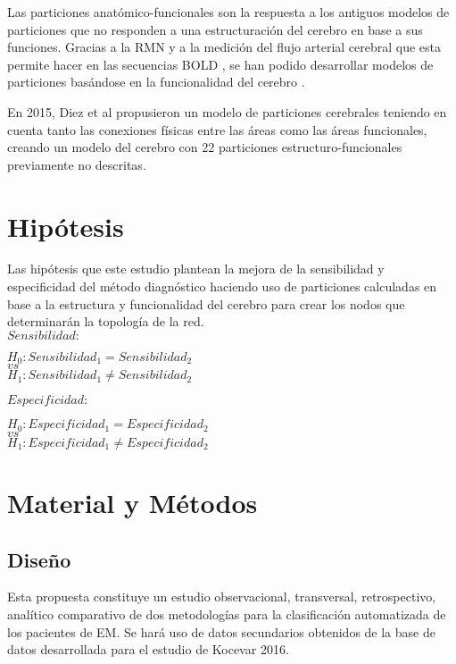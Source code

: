 \documentclass[fleqn,12pt]{UICArticle} %
\begin{document}
Las particiones anatómico-funcionales son la respuesta a los antiguos modelos de particiones que no responden a una estructuración del cerebro en base a sus funciones. Gracias a la RMN y a la medición del flujo arterial cerebral que esta permite hacer en las secuencias BOLD \cite{Ogawa1990}, se han podido desarrollar modelos de particiones basándose en la funcionalidad del cerebro \cite{Heller2006}.

En 2015, Diez et al \cite{Diez2015} propusieron un modelo de particiones cerebrales teniendo en cuenta tanto las conexiones físicas entre las áreas como las áreas funcionales, creando un modelo del cerebro con 22 particiones estructuro-funcionales previamente no descritas. 


\section{Hipótesis}

Las hipótesis que este estudio plantean la mejora de la sensibilidad y especificidad del método diagnóstico haciendo uso de particiones calculadas en base a la estructura y funcionalidad del cerebro para crear los nodos que determinarán la topología de la red. 
\vspace{1em} \\
$Sensibilidad:$
\begin{center}
$H_0: Sensibilidad_1 = Sensibilidad_2$ \\
$vs$ \\
$H_1: Sensibilidad_1 \neq Sensibilidad_2$
\end{center}
$Especificidad:$
\begin{center}
$H_0: Especificidad_1 = Especificidad_2$ \\
$vs$ \\
$H_1: Especificidad_1 \neq Especificidad_2$
\end{center}

\section{Material y Métodos}

\subsection{Diseño}

Esta propuesta constituye un estudio observacional, transversal, retrospectivo, analítico comparativo de dos metodologías para la clasificación automatizada de los pacientes de EM. Se hará uso de datos secundarios obtenidos de la base de datos desarrollada para el estudio de Kocevar 2016\cite{Kocevar2016}.
\end{document}
